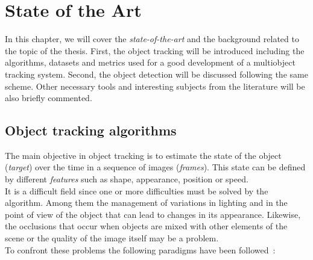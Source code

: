 \chapter{State of the Art}\label{cap.estadodelarte}
\setlength{\parindent}{0pt}
In this chapter, we will cover the \textit{state-of-the-art} and the background related to the topic of the thesis. First, the object tracking will be introduced including the algorithms, datasets and metrics used for a good development of a multiobject tracking system. Second, the object detection will be discussed  following the same scheme. Other necessary tools and interesting subjects from the literature will be also briefly commented.\\
\section{Object tracking algorithms}
The main objective in object tracking is to estimate the state of the object (\textit{target}) over the time in a sequence of images (\textit{frames}). This state can be defined by different \textit{features} such as shape, appearance, position or speed.\\
It is a difficult field since one or more difficulties must be solved by the algorithm. Among them the management of variations in lighting and in the point of view of the object that can lead to changes in its appearance. Likewise, the occlusions that occur when objects are mixed with other elements of the scene or the quality of the image itself may be a problem.\\
To confront these problems the following paradigms have been followed~\cite{smeulders2014visual}:
